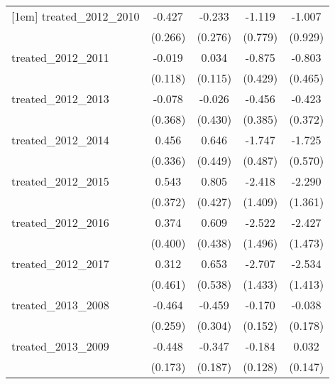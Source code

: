 {\begin{tabular}{l*{4}{c}}
[1em]
treated\_2012\_2010&      -0.427         &      -0.233         &      -1.119         &      -1.007         \\
            &     (0.266)         &     (0.276)         &     (0.779)         &     (0.929)         \\
[1em]
treated\_2012\_2011&      -0.019         &       0.034         &      -0.875\sym{*}  &      -0.803         \\
            &     (0.118)         &     (0.115)         &     (0.429)         &     (0.465)         \\
[1em]
treated\_2012\_2013&      -0.078         &      -0.026         &      -0.456         &      -0.423         \\
            &     (0.368)         &     (0.430)         &     (0.385)         &     (0.372)         \\
[1em]
treated\_2012\_2014&       0.456         &       0.646         &      -1.747\sym{***}&      -1.725\sym{**} \\
            &     (0.336)         &     (0.449)         &     (0.487)         &     (0.570)         \\
[1em]
treated\_2012\_2015&       0.543         &       0.805         &      -2.418         &      -2.290         \\
            &     (0.372)         &     (0.427)         &     (1.409)         &     (1.361)         \\
[1em]
treated\_2012\_2016&       0.374         &       0.609         &      -2.522         &      -2.427         \\
            &     (0.400)         &     (0.438)         &     (1.496)         &     (1.473)         \\
[1em]
treated\_2012\_2017&       0.312         &       0.653         &      -2.707         &      -2.534         \\
            &     (0.461)         &     (0.538)         &     (1.433)         &     (1.413)         \\
[1em]
treated\_2013\_2008&      -0.464         &      -0.459         &      -0.170         &      -0.038         \\
            &     (0.259)         &     (0.304)         &     (0.152)         &     (0.178)         \\
[1em]
treated\_2013\_2009&      -0.448\sym{**} &      -0.347         &      -0.184         &       0.032         \\
            &     (0.173)         &     (0.187)         &     (0.128)         &     (0.147)         \\

\end{tabular}}
